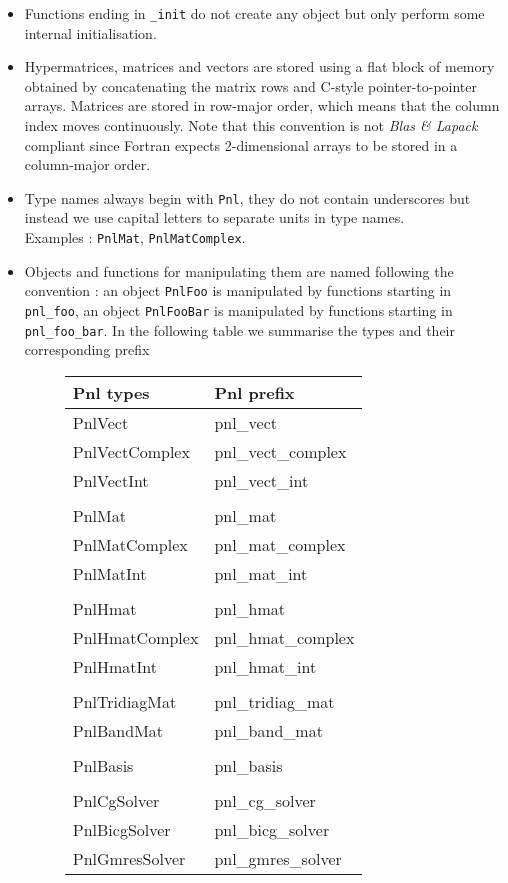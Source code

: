 \documentclass[a4paper,11pt,twoside]{article}
\begin{document}
\begin{itemize}
  \item Functions ending in \verb!_init! do not create any object but only
    perform some internal initialisation.
  
  \item Hypermatrices, matrices and vectors are stored using a flat block of
    memory obtained by concatenating the matrix rows and C-style
    pointer-to-pointer arrays. Matrices are stored in row-major order, which
    means that the column index moves continuously.
    Note that this convention is not \textit{Blas \& Lapack} compliant since
    Fortran expects 2-dimensional arrays to be stored in a column-major order.

  \item Type names always begin with \verb!Pnl!, they do not contain underscores
    but instead we use capital letters to separate units in type names. \\
    Examples : \verb!PnlMat!, \verb!PnlMatComplex!.

  \item Objects and functions for manipulating them are named following the
    convention : an object \verb!PnlFoo! is manipulated by functions starting in
    \verb!pnl_foo!, an object \verb!PnlFooBar! is manipulated by functions starting in
    \verb!pnl_foo_bar!. In the following table we summarise the types and their
    corresponding prefix

    \begin{figure}[h!]
      \centering\begin{tabular}{|l|l|}
      \hline
      Pnl types & Pnl prefix \\
      \hline
      PnlVect & pnl_vect \\
      PnlVectComplex & pnl_vect_complex \\
      PnlVectInt & pnl_vect_int \\
       &\\
      PnlMat & pnl_mat \\
      PnlMatComplex & pnl_mat_complex \\
      PnlMatInt & pnl_mat_int \\
      & \\
      PnlHmat & pnl_hmat \\
      PnlHmatComplex & pnl_hmat_complex \\
      PnlHmatInt & pnl_hmat_int \\
      & \\
      PnlTridiagMat & pnl_tridiag_mat \\
      PnlBandMat & pnl_band_mat \\
      & \\
      PnlBasis & pnl_basis \\
      & \\
      PnlCgSolver & pnl_cg_solver \\
      PnlBicgSolver & pnl_bicg_solver \\
      PnlGmresSolver & pnl_gmres_solver \\
      \hline
    \end{tabular}
  \end{figure}


\end{itemize}
\end{document}
